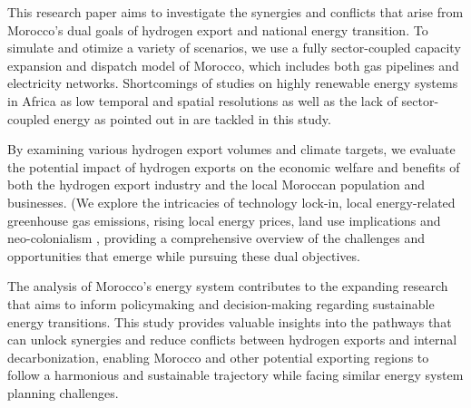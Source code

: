 This research paper aims to investigate the synergies and conflicts that arise from Morocco's dual goals of hydrogen export and national energy transition. To simulate and otimize a variety of scenarios, we use a fully sector-coupled capacity expansion and dispatch model of Morocco, which includes both gas pipelines and electricity networks.
Shortcomings of studies on highly renewable energy systems in Africa as low temporal and spatial resolutions as well as the lack of sector-coupled energy as pointed out in \cite{Oyewo2023} are tackled in this study.

By examining various hydrogen export volumes and climate targets, we evaluate the potential impact of hydrogen exports on the economic welfare and benefits of both the hydrogen export industry and the local Moroccan population and businesses. (We explore the intricacies of technology lock-in, local energy-related greenhouse gas emissions, rising local energy prices, land use implications and neo-colonialism \cite{HabeckEnergieimperialismus, TerraponPfaff2019, Hanger2016}, providing a comprehensive overview of the challenges and opportunities that emerge while pursuing these dual objectives.

The analysis of Morocco's energy system contributes to the expanding research that aims to inform policymaking and decision-making regarding sustainable energy transitions. This study provides valuable insights into the pathways that can unlock synergies and reduce conflicts between hydrogen exports and internal decarbonization, enabling Morocco and other potential exporting regions to follow a harmonious and sustainable trajectory while facing similar energy system planning challenges.



%


